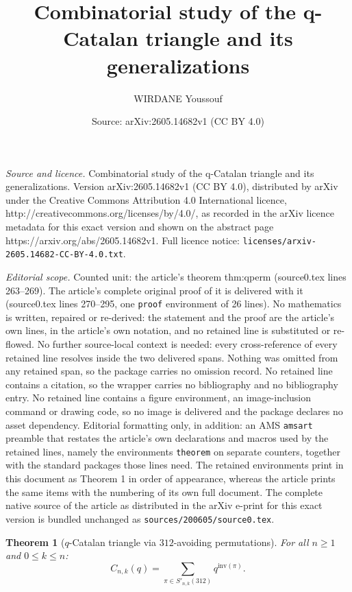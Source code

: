 \documentclass[10pt,a4paper]{amsart}
\title{Combinatorial study of the q-Catalan triangle and its generalizations}
\author{WIRDANE Youssouf}
\date{Source: arXiv:2605.14682v1 (CC BY 4.0)}
\newtheorem{theorem}{Theorem}
\newcommand{\Inv}{\mathrm{inv}}
\newcommand{\Snkp}[1]{S'_{n,k}(#1)}
\begin{document}
\maketitle

\noindent\emph{Source and licence.} Combinatorial study of the q-Catalan triangle and its generalizations. Version arXiv:2605.14682v1 (CC BY 4.0), distributed by arXiv under the Creative Commons Attribution 4.0 International licence, http://creativecommons.org/licenses/by/4.0/, as recorded in the arXiv licence metadata for this exact version and shown on the abstract page https://arxiv.org/abs/2605.14682v1. Full licence notice: \texttt{licenses/arxiv-2605.14682-CC-BY-4.0.txt}.\par\smallskip

\noindent\textit{Editorial scope.} Counted unit: the article's theorem thm:qperm (source0.tex lines 263--269). The article's complete original proof of it is delivered with it (source0.tex lines 270--295, one \texttt{proof} environment of 26 lines). No mathematics is written, repaired or re-derived: the statement and the proof are the article's own lines, in the article's own notation, and no retained line is substituted or re-flowed.  No further source-local context is needed: every cross-reference of every retained line resolves inside the two delivered spans.  Nothing was omitted from any retained span, so the package carries no omission record.  No retained line contains a citation, so the wrapper carries no bibliography and no bibliography entry.  No retained line contains a figure environment, an image-inclusion command or drawing code, so no image is delivered and the package declares no asset dependency.  Editorial formatting only, in addition: an AMS \texttt{amsart} preamble that restates the article's own declarations and macros used by the retained lines, namely the environments \texttt{theorem} on separate counters, together with the standard packages those lines need.  The retained environments print in this document as Theorem 1 in order of appearance, whereas the article prints the same items with the numbering of its own full document.  The complete native source of the article as distributed in the arXiv e-print for this exact version is bundled unchanged as \texttt{sources/200605/source0.tex}.
\begin{theorem}[$q$-Catalan triangle via $312$-avoiding permutations]
\label{thm:qperm}
For all $n\ge1$ and $0\le k\le n$:
\begin{equation}\label{eq:inv312}
C_{n,k}(q) = \sum_{\pi\in\Snkp{312}} q^{\Inv(\pi)}.
\end{equation}
\end{theorem}
\end{document}
